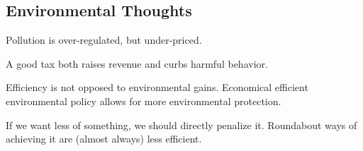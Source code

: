 \subsection{Environmental Thoughts}

\thought Pollution is over-regulated, but under-priced.

\thought A good tax both raises revenue and curbs harmful behavior.

\thought Efficiency is not opposed to environmental gains. Economical efficient
environmental policy allows for more environmental protection.

\thought If we want less of something, we should directly penalize it.
Roundabout ways of achieving it are (almost always) less efficient.

